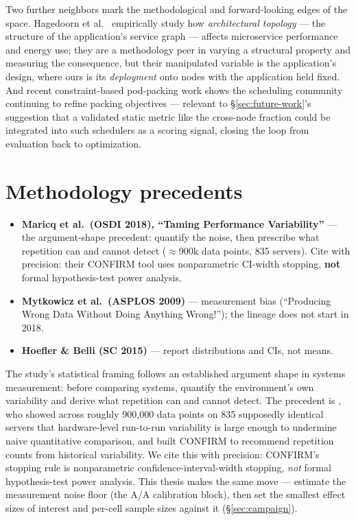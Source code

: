 Two further neighbors mark the methodological and forward-looking edges of
the space. Hagedoorn et al.\ \citep{hagedoorn2026topology} empirically study how
\emph{architectural topology} --- the structure of the application's service
graph --- affects microservice performance and energy use; they are a methodology
peer in varying a structural property and measuring the consequence, but their
manipulated variable is the application's design, where ours is its
\emph{deployment} onto nodes with the application held fixed. And recent
constraint-based pod-packing work \citep{priority2025packing} shows the
scheduling community continuing to refine packing objectives --- relevant to
\S\ref{sec:future-work}'s suggestion that a validated static metric like the
cross-node fraction could be integrated into such schedulers as a scoring
signal, closing the loop from evaluation back to optimization.

\section{Methodology precedents}\label{sec:methodology-precedents}

\begin{itemize}
\item \textbf{Maricq et al.\ (OSDI 2018), ``Taming Performance Variability''} --- the
  argument-shape precedent: quantify the noise, then prescribe what repetition
  can and cannot detect ($\approx$900k data points, 835 servers). Cite with
  precision: their CONFIRM tool uses nonparametric CI-width stopping, \textbf{not}
  formal hypothesis-test power analysis.
\item \textbf{Mytkowicz et al.\ (ASPLOS 2009)} --- measurement bias (``Producing Wrong
  Data Without Doing Anything Wrong!''); the lineage does not start in 2018.
\item \textbf{Hoefler \& Belli (SC 2015)} --- report distributions and CIs, not means.
\end{itemize}

The study's statistical framing follows an established argument shape in systems
measurement: before comparing systems, quantify the environment's own
variability and derive what repetition can and cannot detect. The precedent is
\citet{maricq2018taming}, who showed across roughly 900,000 data points on 835
supposedly identical servers that hardware-level run-to-run variability is large
enough to undermine naive quantitative comparison, and built CONFIRM to
recommend repetition counts from historical variability. We cite this with
precision: CONFIRM's stopping rule is nonparametric confidence-interval-width
stopping, \emph{not} formal hypothesis-test power analysis. This thesis makes the
same move --- estimate the measurement noise floor (the A/A calibration block),
then set the smallest effect sizes of interest and per-cell sample sizes against
it (\S\ref{sec:campaign}).

